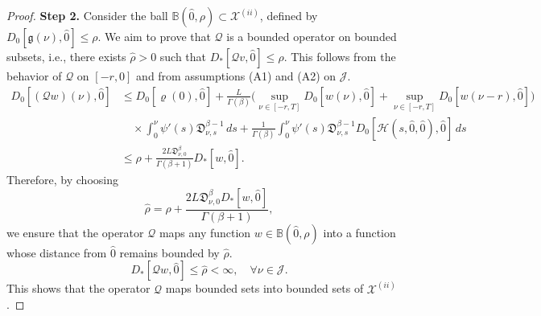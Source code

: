 \documentclass[10pt,a4paper]{amsart}
\numberwithin{equation}{section}
\begin{document}
\begin{proof}
\noindent\textbf{Step 2.} 
Consider the ball \( \mathbb{B}(\hat{0}, \rho) \subset \mathcal{X}^{(ii)} \), 
defined by \( D_0[\mathfrak{g}(\nu ), \hat{0}] \leq \rho \). 
We aim to prove that \( \mathcal{Q} \) is a bounded operator on bounded subsets, 
i.e., there exists \( \hat{\rho} > 0 \) such that 
\( D_{*}[\mathcal{Q}v, \hat{0}] \leq \hat{\rho} \). This follows from the behavior of 
\( \mathcal{Q} \) on \( [-r, 0] \) and from assumptions (A1) and (A2) on 
\( \mathcal{J} \).
\begin{align*}
D_0[(\mathcal{Q} w)(\nu ), \hat{0}]
&\leq  D_0[\varrho(0), \hat{0}]
 +\frac{L}{\Gamma(\beta)}\Big(\sup _{\nu \in[- r, T]} D_0[ w(\nu ), \hat{0}]
 +\sup _{\nu \in[- r, T]} D_0[ w(\nu - r), \hat{0}]\Big) \\
&\quad\times \int_0^{\nu } \psi'(s)\mathfrak{D}_{\nu ,s}^{\beta-1}\,ds
 +\frac{1}{\Gamma(\beta)} \int_0^{\nu } \psi'(s)\mathfrak{D}_{\nu ,s}^{\beta-1}
  D_0[\mathcal{H}(s, \hat{0}, \hat{0}), \hat{0}]\,ds \\
&\leq  \rho+ \frac{2L\mathfrak{D}_{\nu ,0}^{\beta}}{\Gamma(\beta+1)} D_{*}[ w, \hat{0}].
\end{align*}
Therefore, by choosing
$$
\hat{\rho} = \rho + \frac{2L\mathfrak{D}_{\nu ,0}^{\beta} D_{*}
[ w, \hat{0}]}{\Gamma(\beta+1)},
$$
we ensure that the operator \( \mathcal{Q} \) maps any function 
\( w \in \mathbb{B}(\hat{0}, \rho) \) into a function whose distance from 
\( \hat{0} \) remains bounded by \( \hat{\rho} \).
$$
D_{*}[\mathcal{Q} w, \hat{0}] \leq \hat{\rho}<\infty, \quad \forall \nu \in\mathcal{J} .
$$
This shows that the operator $\mathcal{Q}$ maps bounded sets into bounded sets of 
$\mathcal{X}^{(ii)}$.
\smallskip


\end{proof}
\end{document}
